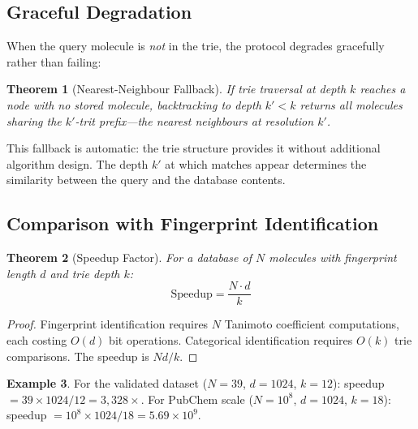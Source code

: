 \documentclass[11pt,twocolumn,a4paper]{article}
\newtheorem{theorem}{Theorem}[section]
\theoremstyle{definition}
\newtheorem{example}[theorem]{Example}
\theoremstyle{remark}
\begin{document}
\subsection{Graceful Degradation}

When the query molecule is \emph{not} in the trie, the protocol degrades gracefully rather than failing:

\begin{theorem}[Nearest-Neighbour Fallback]
\label{thm:nn_fallback}
If trie traversal at depth $k$ reaches a node with no stored molecule, backtracking to depth $k' < k$ returns all molecules sharing the $k'$-trit prefix---the nearest neighbours at resolution $k'$.
\end{theorem}

This fallback is automatic: the trie structure provides it without additional algorithm design. The depth $k'$ at which matches appear determines the similarity between the query and the database contents.

\subsection{Comparison with Fingerprint Identification}

\begin{theorem}[Speedup Factor]
\label{thm:speedup}
For a database of $N$ molecules with fingerprint length $d$ and trie depth $k$:
\begin{equation}
\text{Speedup} = \frac{N \cdot d}{k}
\label{eq:speedup}
\end{equation}
\end{theorem}

\begin{proof}
Fingerprint identification requires $N$ Tanimoto coefficient computations, each costing $O(d)$ bit operations. Categorical identification requires $O(k)$ trie comparisons. The speedup is $Nd/k$.
\end{proof}

\begin{example}
For the validated dataset ($N = 39$, $d = 1024$, $k = 12$): speedup $= 39 \times 1024 / 12 = 3{,}328\times$. For PubChem scale ($N = 10^8$, $d = 1024$, $k = 18$): speedup $= 10^8 \times 1024 / 18 = 5.69 \times 10^9$.
\end{example}
\end{document}
